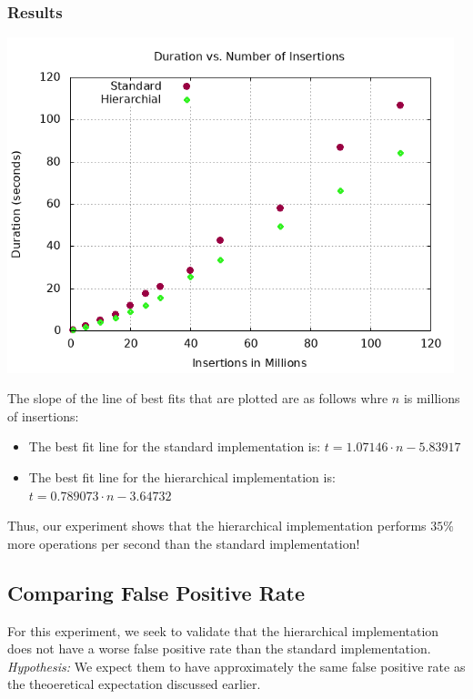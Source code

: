 \subsubsection{Results}
\begin{center}
    \includegraphics[width=13cm]{plots/scale-nm.png}
\end{center}
The slope of the line of best fits that are plotted are as follows whre $n$ is millions of insertions:
\begin{itemize}
    \item The best fit line for the standard implementation is: $t = 1.07146\cdot n - 5.83917$
    \item The best fit line for the hierarchical implementation is: $t = 0.789073\cdot n -3.64732 $
\end{itemize}
Thus, our experiment shows that the hierarchical implementation performs $35\%$ more operations per second than the standard implementation!


\subsection{Comparing False Positive Rate}

For this experiment, we seek to validate that the hierarchical implementation does not have a worse false positive rate than the standard implementation.
\textit{Hypothesis:} We expect them to have approximately the same false positive rate as the theoeretical expectation discussed earlier.

